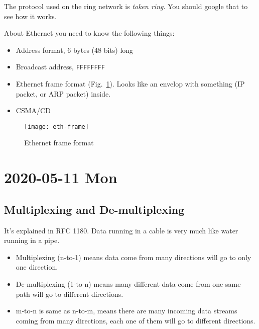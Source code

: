 \documentclass{article}
\begin{document}
The protocol used on the ring network is \emph{token ring}. You should google that to see
how it works.

About Ethernet you need to know the following things:
\begin{itemize}
\item Address format, 6 bytes (48 bits) long
\item Broadcast address, \texttt{FFFFFFFF}
\item Ethernet frame format (Fig.~\ref{fig:eth-frame}). Looks like an envelop with
  something (IP packet, or ARP packet) inside.
\item CSMA/CD
\end{itemize}

\begin{figure}
  \centering
  \texttt{[image: eth-frame]}
  \caption{Ethernet frame format}
  \label{fig:eth-frame}
\end{figure}





\section{2020-05-11 Mon}

\subsection{Multiplexing and De-multiplexing}
\label{sec:mult-de-mult}

It's explained in RFC 1180. Data running in a cable is very much like water running in a
pipe.

\begin{itemize}
\item Multiplexing (n-to-1) means data come from many directions will go to only one
  direction.
\item De-multiplexing (1-to-n) means many different data come from one same path will go to
  different directions.
\item m-to-n is same as n-to-m, means there are many incoming data streams coming from
  many directions, each one of them will go to different directions.
\end{itemize}
\end{document}
